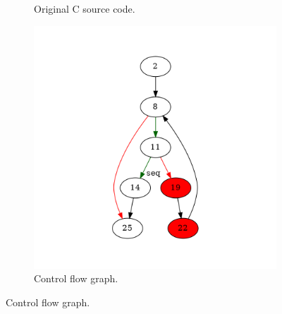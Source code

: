 \begin{figure}[htbp]
	\centering
	\begin{subfigure}[b]{0.48\textwidth}
		\centering
		
		\caption{Original C source code.}
	\end{subfigure}
	\begin{subfigure}[b]{0.50\textwidth}
		\centering
		\includegraphics[width=\textwidth]{inc/appendices/examples/hammock/counter-example/with-break/main_0001a.png}
		\caption{Control flow graph.}
	\end{subfigure}
\end{figure}

